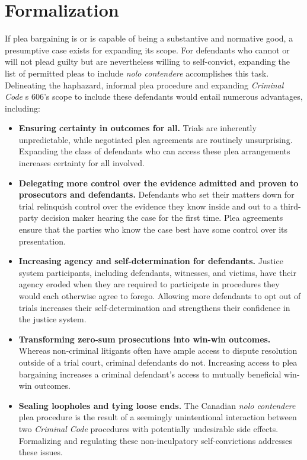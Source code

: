 \section{Formalization}

If plea bargaining is or is capable of being a substantive and normative good, a presumptive case exists for expanding its scope. For defendants who cannot or will not plead guilty but are nevertheless willing to self-convict, expanding the list of permitted pleas to include \textit{nolo contendere} accomplishes this task. Delineating the haphazard, informal plea procedure and expanding \textit{Criminal Code} s 606's scope to include these defendants would entail numerous advantages, including:

\begin{itemize}
    \item \textbf{Ensuring certainty in outcomes for all.} Trials are inherently unpredictable, while negotiated plea agreements are routinely unsurprising. Expanding the class of defendants who can access these plea arrangements increases certainty for all involved.
    \item \textbf{Delegating more control over the evidence admitted and proven to prosecutors and defendants.} Defendants who set their matters down for trial relinquish control over the evidence they know inside and out to a third-party decision maker hearing the case for the first time. Plea agreements ensure that the parties who know the case best have some control over its presentation.
    \item \textbf{Increasing agency and self-determination for defendants.} Justice system participants, including defendants, witnesses, and victims, have their agency eroded when they are required to participate in procedures they would each otherwise agree to forego. Allowing more defendants to opt out of trials increases their self-determination and strengthens their confidence in the justice system.
    \item \textbf{Transforming zero-sum prosecutions into win-win outcomes.} Whereas non-criminal litigants often have ample access to dispute resolution outside of a trial court, criminal defendants do not. Increasing access to plea bargaining increases a criminal defendant's access to mutually beneficial win-win outcomes. 
    \item \textbf{Sealing loopholes and tying loose ends.} The Canadian \textit{nolo contendere} plea procedure is the result of a seemingly unintentional interaction between two \textit{Criminal Code} procedures with potentially undesirable side effects. Formalizing and regulating these non-inculpatory self-convictions addresses these issues.
\end{itemize}

